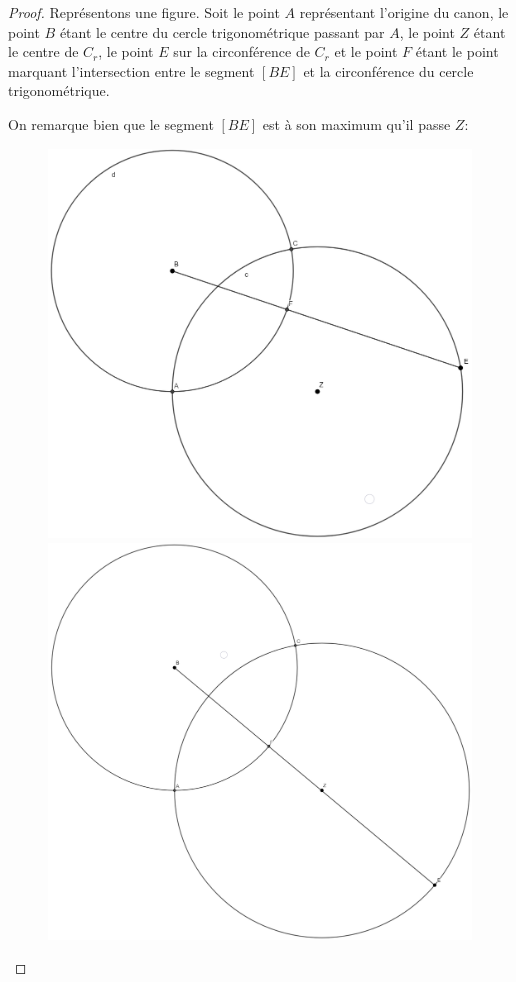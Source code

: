 \documentclass{amsart}
\theoremstyle{definition}
\theoremstyle{remark}
\numberwithin{equation}{section}
\begin{document}
\begin{proof}
  Représentons une figure. Soit le point $A$ représentant l'origine du canon, le point $B$ étant le centre du cercle trigonométrique passant par $A$, le point $Z$ étant le centre de $C_r$, le point
  $E$ sur la circonférence de $C_r$ et le point $F$ étant le point marquant l'intersection entre le segment $[BE]$ et la circonférence du cercle trigonométrique.

  On remarque bien que le segment $[BE]$ est à son maximum qu'il passe $Z$:

  \begin{figure}[H]
    \centering
    \includegraphics[scale=0.171,valign=t]{images/visual_proof_2.png}
    \includegraphics[scale=0.122,valign=t]{images/visual_proof.png}

\end{figure}
\end{proof}
\end{document}
